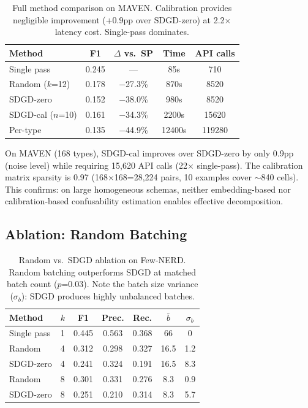 \documentclass[11pt,a4paper]{article}
\begin{document}
\begin{table}[h]
\centering
\small
\begin{tabular}{@{}lcccc@{}}
\toprule
\textbf{Method} & \textbf{F1} & \textbf{$\Delta$ vs.\ SP} & \textbf{Time} & \textbf{API calls} \\
\midrule
Single pass & 0.245 & --- & 85s & 710 \\
Random ($k$=12) & 0.178 & $-$27.3\% & 870s & 8520 \\
SDGD-zero & 0.152 & $-$38.0\% & 980s & 8520 \\
SDGD-cal ($n$=10) & 0.161 & $-$34.3\% & 2200s & 15620 \\
Per-type & 0.135 & $-$44.9\% & 12400s & 119280 \\
\bottomrule
\end{tabular}
\caption{Full method comparison on MAVEN. Calibration provides negligible improvement (+0.9pp over SDGD-zero) at 2.2$\times$ latency cost. Single-pass dominates.}
\label{tab:sdgd_cal_maven}
\end{table}

On MAVEN (168 types), SDGD-cal improves over SDGD-zero by only 0.9pp (noise level) while requiring 15,620 API calls (22$\times$ single-pass). The calibration matrix sparsity is 0.97 (168$\times$168=28,224 pairs, 10 examples cover $\sim$840 cells). This confirms: on large homogeneous schemas, neither embedding-based nor calibration-based confusability estimation enables effective decomposition.

\subsection{Ablation: Random Batching}
\label{sec:random_ablation}

\begin{table}[h]
\centering
\small
\begin{tabular}{@{}llccccc@{}}
\toprule
\textbf{Method} & $k$ & \textbf{F1} & \textbf{Prec.} & \textbf{Rec.} & \textbf{$\bar{b}$} & \textbf{$\sigma_b$} \\
\midrule
Single pass & 1 & 0.445 & 0.563 & 0.368 & 66 & 0 \\
Random & 4 & 0.312 & 0.298 & 0.327 & 16.5 & 1.2 \\
SDGD-zero & 4 & 0.241 & 0.324 & 0.191 & 16.5 & 8.3 \\
Random & 8 & 0.301 & 0.331 & 0.276 & 8.3 & 0.9 \\
SDGD-zero & 8 & 0.251 & 0.210 & 0.314 & 8.3 & 5.7 \\
\bottomrule
\end{tabular}
\caption{Random vs.\ SDGD ablation on Few-NERD. Random batching outperforms SDGD at matched batch count ($p$=0.03). Note the batch size variance ($\sigma_b$): SDGD produces highly unbalanced batches.}
\label{tab:random_ablation}
\end{table}
\end{document}
